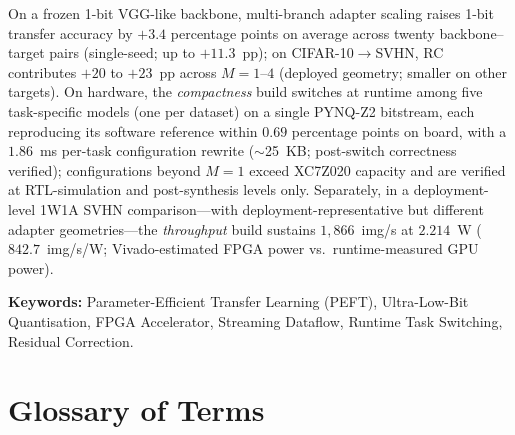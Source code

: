 \documentclass[12pt, a4paper]{report}
\numberwithin{equation}{chapter}
\numberwithin{figure}{chapter}
\numberwithin{table}{chapter}
\numberwithin{algorithm}{chapter}
\begin{document}
On a frozen 1-bit VGG-like backbone, multi-branch adapter scaling raises 1-bit transfer accuracy by $+3.4$ percentage points on average across twenty backbone--target pairs (single-seed; up to $+11.3$~pp); on CIFAR-10$\to$SVHN, RC contributes $+20$ to $+23$~pp across $M{=}1$--$4$ (deployed geometry; smaller on other targets). On hardware, the \emph{compactness} build switches at runtime among five task-specific models (one per dataset) on a single PYNQ-Z2 bitstream, each reproducing its software reference within $0.69$ percentage points on board, with a $1.86$~ms per-task configuration rewrite ($\sim$25~KB; post-switch correctness verified); configurations beyond $M{=}1$ exceed XC7Z020 capacity and are verified at RTL-simulation and post-synthesis levels only. Separately, in a deployment-level 1W1A SVHN comparison---with deployment-representative but different adapter geometries---the \emph{throughput} build sustains $1{,}866$~img/s at $2.214$~W ($842.7$~img/s/W; Vivado-estimated FPGA power vs.\ runtime-measured GPU power).

\vspace{0.3em}
\noindent \textbf{Keywords:} Parameter-Efficient Transfer Learning (PEFT), Ultra-Low-Bit Quantisation, FPGA Accelerator, Streaming Dataflow, Runtime Task Switching, Residual Correction.

\newpage
\tableofcontents
\newpage
\section*{Glossary of Terms}
\end{document}
